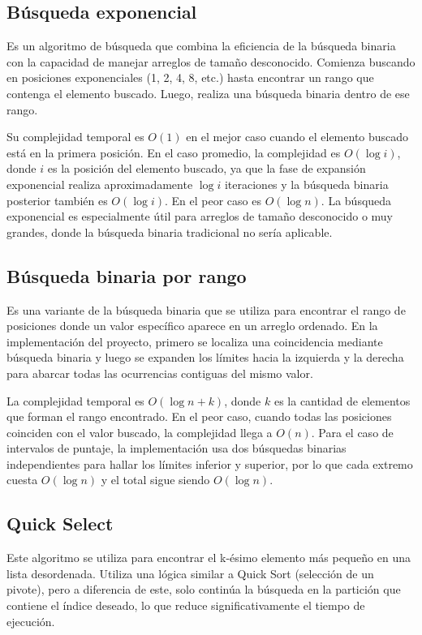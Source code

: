 \subsection{Búsqueda exponencial}
Es un algoritmo de búsqueda que combina la eficiencia de la búsqueda binaria con la capacidad de manejar arreglos de tamaño desconocido. Comienza buscando en posiciones exponenciales (1, 2, 4, 8, etc.) hasta encontrar un rango que contenga el elemento buscado. Luego, realiza una búsqueda binaria dentro de ese rango.

Su complejidad temporal es \(O(1)\) en el mejor caso cuando el elemento buscado está en la primera posición. En el caso promedio, la complejidad es \(O(\log i)\), donde \(i\) es la posición del elemento buscado, ya que la fase de expansión exponencial realiza aproximadamente \(\log i\) iteraciones y la búsqueda binaria posterior también es \(O(\log i)\). En el peor caso es \(O(\log n)\). La búsqueda exponencial es especialmente útil para arreglos de tamaño desconocido o muy grandes, donde la búsqueda binaria tradicional no sería aplicable.

\subsection{Búsqueda binaria por rango}
Es una variante de la búsqueda binaria que se utiliza para encontrar el rango de posiciones donde un valor específico aparece en un arreglo ordenado. En la implementación del proyecto, primero se localiza una coincidencia mediante búsqueda binaria y luego se expanden los límites hacia la izquierda y la derecha para abarcar todas las ocurrencias contiguas del mismo valor.

La complejidad temporal es \(O(\log n + k)\), donde \(k\) es la cantidad de elementos que forman el rango encontrado. En el peor caso, cuando todas las posiciones coinciden con el valor buscado, la complejidad llega a \(O(n)\). Para el caso de intervalos de puntaje, la implementación usa dos búsquedas binarias independientes para hallar los límites inferior y superior, por lo que cada extremo cuesta \(O(\log n)\) y el total sigue siendo \(O(\log n)\).

\subsection{Quick Select}
Este algoritmo se utiliza para encontrar el k-ésimo elemento más pequeño en una lista desordenada. Utiliza una lógica similar a Quick Sort (selección de un pivote), pero a diferencia de este, solo continúa la búsqueda en la partición que contiene el índice deseado, lo que reduce significativamente el tiempo de ejecución.

